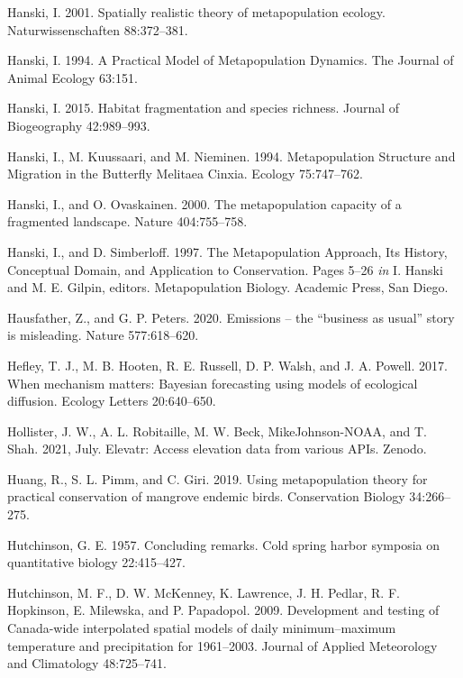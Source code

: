 \documentclass[12pt]{article}
\newlength{\cslhangindent}
\newenvironment{cslreferences}%
  {\setlength{\parindent}{0pt}%
  \everypar{\setlength{\hangindent}{\cslhangindent}}\ignorespaces}%
  {\par}
\begin{document}
\begin{cslreferences}
\leavevmode\hypertarget{ref-hanski_spatially_2001}{}%
Hanski, I. 2001. Spatially realistic theory of metapopulation ecology.
Naturwissenschaften 88:372--381.

\leavevmode\hypertarget{ref-hanski_practical_1994}{}%
Hanski, I. 1994. A Practical Model of Metapopulation Dynamics. The
Journal of Animal Ecology 63:151.

\leavevmode\hypertarget{ref-hanski_habitat_2015}{}%
Hanski, I. 2015. Habitat fragmentation and species richness. Journal of
Biogeography 42:989--993.

\leavevmode\hypertarget{ref-hanski_metapopulation_1994}{}%
Hanski, I., M. Kuussaari, and M. Nieminen. 1994. Metapopulation
Structure and Migration in the Butterfly Melitaea Cinxia. Ecology
75:747--762.

\leavevmode\hypertarget{ref-hanski_metapopulation_2000}{}%
Hanski, I., and O. Ovaskainen. 2000. The metapopulation capacity of a
fragmented landscape. Nature 404:755--758.

\leavevmode\hypertarget{ref-hanski_metapopulation_1997}{}%
Hanski, I., and D. Simberloff. 1997. The Metapopulation Approach, Its
History, Conceptual Domain, and Application to Conservation. Pages 5--26
\emph{in} I. Hanski and M. E. Gilpin, editors. Metapopulation Biology.
Academic Press, San Diego.

\leavevmode\hypertarget{ref-hausfather_emissions_2020}{}%
Hausfather, Z., and G. P. Peters. 2020. Emissions -- the ``business as
usual'' story is misleading. Nature 577:618--620.

\leavevmode\hypertarget{ref-hefley_when_2017}{}%
Hefley, T. J., M. B. Hooten, R. E. Russell, D. P. Walsh, and J. A.
Powell. 2017. When mechanism matters: Bayesian forecasting using models
of ecological diffusion. Ecology Letters 20:640--650.

\leavevmode\hypertarget{ref-hollister_elevatr_2021}{}%
Hollister, J. W., A. L. Robitaille, M. W. Beck, MikeJohnson-NOAA, and T.
Shah. 2021, July. Elevatr: Access elevation data from various APIs.
Zenodo.

\leavevmode\hypertarget{ref-huang_using_2019}{}%
Huang, R., S. L. Pimm, and C. Giri. 2019. Using metapopulation theory
for practical conservation of mangrove endemic birds. Conservation
Biology 34:266--275.

\leavevmode\hypertarget{ref-hutchinson_concluding_1957}{}%
Hutchinson, G. E. 1957. Concluding remarks. Cold spring harbor symposia
on quantitative biology 22:415--427.

\leavevmode\hypertarget{ref-hutchinson_development_2009}{}%
Hutchinson, M. F., D. W. McKenney, K. Lawrence, J. H. Pedlar, R. F.
Hopkinson, E. Milewska, and P. Papadopol. 2009. Development and testing
of Canada-wide interpolated spatial models of daily minimum--maximum
temperature and precipitation for 1961--2003. Journal of Applied
Meteorology and Climatology 48:725--741.


\end{cslreferences}
\end{document}
